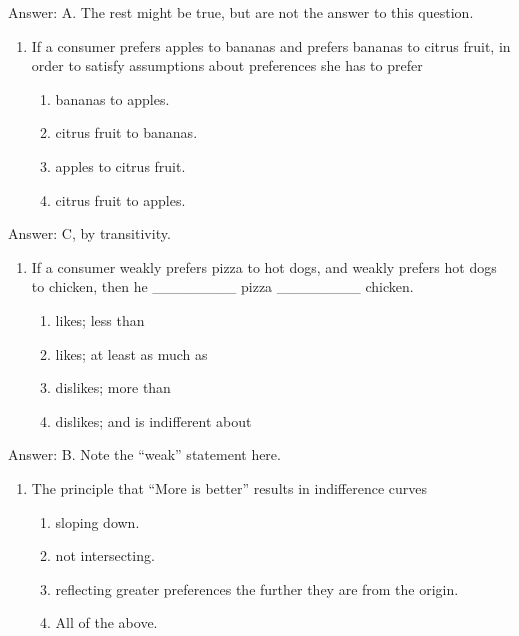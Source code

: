\documentclass[11pt,]{article}
\providecommand{\tightlist}{%
  \setlength{\itemsep}{0pt}\setlength{\parskip}{0pt}}
\begin{document}
Answer: A. The rest might be true, but are not the answer to this
question.

\begin{enumerate}
\def\labelenumi{\arabic{enumi})}
\setcounter{enumi}{2}
\tightlist
\item
  If a consumer prefers apples to bananas and prefers bananas to citrus
  fruit, in order to satisfy assumptions about preferences she has to
  prefer

  \begin{enumerate}
  \def\labelenumii{\Alph{enumii})}
  \tightlist
  \item
    bananas to apples.
  \item
    citrus fruit to bananas.
  \item
    apples to citrus fruit.
  \item
    citrus fruit to apples.
  \end{enumerate}
\end{enumerate}

Answer: C, by transitivity.

\begin{enumerate}
\def\labelenumi{\arabic{enumi})}
\setcounter{enumi}{3}
\tightlist
\item
  If a consumer weakly prefers pizza to hot dogs, and weakly prefers hot
  dogs to chicken, then he \_\_\_\_\_\_\_\_ pizza \_\_\_\_\_\_\_\_
  chicken.

  \begin{enumerate}
  \def\labelenumii{\Alph{enumii})}
  \tightlist
  \item
    likes; less than
  \item
    likes; at least as much as
  \item
    dislikes; more than
  \item
    dislikes; and is indifferent about
  \end{enumerate}
\end{enumerate}

Answer: B. Note the ``weak'' statement here.

\begin{enumerate}
\def\labelenumi{\arabic{enumi})}
\setcounter{enumi}{4}
\tightlist
\item
  The principle that ``More is better'' results in indifference curves

  \begin{enumerate}
  \def\labelenumii{\Alph{enumii})}
  \tightlist
  \item
    sloping down.
  \item
    not intersecting.
  \item
    reflecting greater preferences the further they are from the origin.
  \item
    All of the above.
  \end{enumerate}
\end{enumerate}
\end{document}

